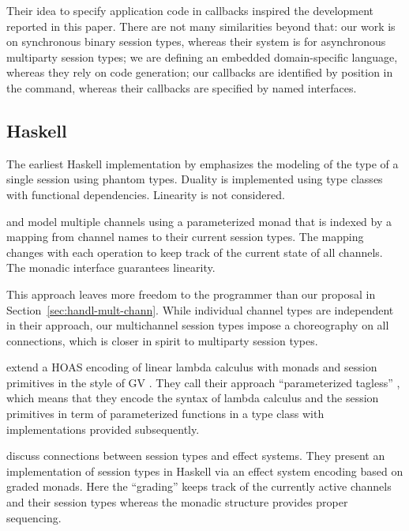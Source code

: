 \documentclass[acmsmall,screen]{acmart}
\begin{document}
Their idea to specify application code in callbacks inspired the
development reported in this paper. There are not many similarities
beyond that: our work is on synchronous binary session types, whereas
their system is for asynchronous multiparty session types; we are
defining an embedded domain-specific language, whereas they rely on
code generation; our callbacks are identified by position in the
command, whereas their callbacks are specified by named interfaces.

\subsection{Haskell}
\label{sec:hask-impl}

The earliest Haskell implementation by \citet{DBLP:conf/padl/NeubauerT04}
emphasizes the modeling of the type of a single session using phantom
types. Duality is implemented using type classes with functional
dependencies. Linearity is not considered.

\citet{SackmanE08} and \citet{DBLP:conf/popl/TovP11} model
multiple channels using a parameterized monad that is indexed by a mapping
from channel names to their current session types. The mapping changes
with each operation to keep track of the current state of all
channels. The monadic interface guarantees linearity.

This approach leaves more freedom to the programmer than our proposal
in Section~\ref{sec:handl-mult-chann}. While individual channel types
are independent in their approach, our multichannel session types
impose a choreography on all connections, which is closer in spirit to
multiparty session types. 

\citet{DBLP:conf/haskell/LindleyM16} extend a HOAS
encoding of linear lambda calculus with monads and session primitives
in the style of GV \cite{DBLP:journals/jfp/GayV10}. They call their approach
``parameterized tagless'' \cite{DBLP:journals/jfp/CaretteKS09}, which means that they encode the syntax of
lambda calculus and the session primitives in term of parameterized
functions in a type class with implementations provided subsequently.

\citet{DBLP:conf/popl/OrchardY16} discuss
connections between session types and effect systems. They present an
implementation of session types in Haskell via an effect system
encoding based on graded monads. Here the ``grading'' keeps track of
the currently active channels and their session types whereas the
monadic structure provides proper sequencing.
\end{document}
